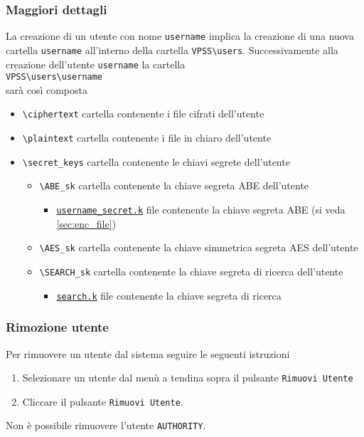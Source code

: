 \documentclass[a4paper,twoside,10pt,openany]{scrbook}
\begin{document}
\subsubsection*{Maggiori dettagli}
La creazione di un utente con nome \texttt{username} implica la creazione di una nuova cartella \texttt{username} all'interno della cartella \texttt{VPSS\textbackslash users}.
Successivamente alla creazione dell'utente \texttt{username} la cartella\\
\texttt{VPSS\textbackslash users\textbackslash username}\\
sarà così composta
\begin{itemize}
 \item \texttt{\textbackslash ciphertext} cartella contenente i file cifrati dell'utente
 \item \texttt{\textbackslash plaintext} cartella contenente i file in chiaro dell'utente
 \item \texttt{\textbackslash secret\_keys}  cartella contenente le chiavi segrete dell'utente
  \begin{itemize}
  \item \texttt{\textbackslash ABE\_sk} cartella contenente la chiave segreta ABE dell'utente
  \begin{itemize}
   \item \texttt{\hyperref[sec:format_sk]{username\_secret.k}} file contenente la chiave segreta ABE (si veda \ref{sec:enc_file})
  \end{itemize}
  \item \texttt{\textbackslash AES\_sk} cartella contenente la chiave simmetrica segreta AES dell'utente
  \item \texttt{\textbackslash SEARCH\_sk} cartella contenente la chiave segreta di ricerca dell'utente
  \begin{itemize}
   \item \texttt{\hyperref[sec:format_searchk]{search.k}} file contenente la chiave segreta di ricerca
  \end{itemize}
  \end{itemize}
\end{itemize}

%
\subsubsection{Rimozione utente}\label{sec:rimozione_utente}
%
Per rimuovere un utente dal sistema seguire le seguenti istruzioni
\begin{enumerate}
 \item Selezionare un utente dal menù a tendina sopra il pulsante \texttt{Rimuovi Utente}
 \item Cliccare il pulsante \texttt{Rimuovi Utente}.
\end{enumerate}
Non è possibile rimuovere l'utente \texttt{AUTHORITY}.
%
\end{document}
